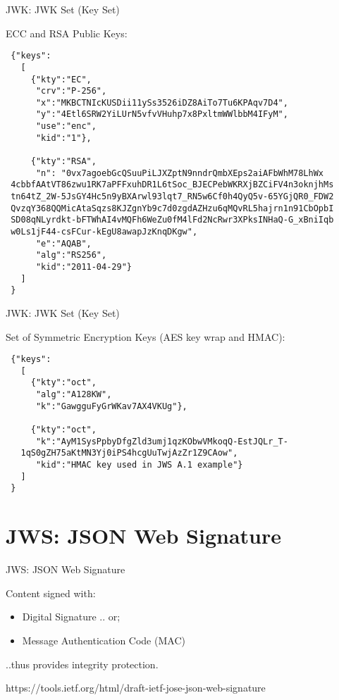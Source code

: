 \begin{frame}[fragile]{JWK: JWK Set (Key Set)}

ECC and RSA Public Keys:

\tiny

\begin{verbatim}
 {"keys":
   [
     {"kty":"EC",
      "crv":"P-256",
      "x":"MKBCTNIcKUSDii11ySs3526iDZ8AiTo7Tu6KPAqv7D4",
      "y":"4Etl6SRW2YiLUrN5vfvVHuhp7x8PxltmWWlbbM4IFyM",
      "use":"enc",
      "kid":"1"},

     {"kty":"RSA",
      "n": "0vx7agoebGcQSuuPiLJXZptN9nndrQmbXEps2aiAFbWhM78LhWx
 4cbbfAAtVT86zwu1RK7aPFFxuhDR1L6tSoc_BJECPebWKRXjBZCiFV4n3oknjhMs
 tn64tZ_2W-5JsGY4Hc5n9yBXArwl93lqt7_RN5w6Cf0h4QyQ5v-65YGjQR0_FDW2
 QvzqY368QQMicAtaSqzs8KJZgnYb9c7d0zgdAZHzu6qMQvRL5hajrn1n91CbOpbI
 SD08qNLyrdkt-bFTWhAI4vMQFh6WeZu0fM4lFd2NcRwr3XPksINHaQ-G_xBniIqb
 w0Ls1jF44-csFCur-kEgU8awapJzKnqDKgw",
      "e":"AQAB",
      "alg":"RS256",
      "kid":"2011-04-29"}
   ]
 }
\end{verbatim}

\end{frame}

\begin{frame}[fragile]{JWK: JWK Set (Key Set)}

Set of Symmetric Encryption Keys (AES key wrap and HMAC):

\small

\begin{verbatim}
 {"keys":
   [
     {"kty":"oct",
      "alg":"A128KW",
      "k":"GawgguFyGrWKav7AX4VKUg"},

     {"kty":"oct",
      "k":"AyM1SysPpbyDfgZld3umj1qzKObwVMkoqQ-EstJQLr_T-
   1qS0gZH75aKtMN3Yj0iPS4hcgUuTwjAzZr1Z9CAow",
      "kid":"HMAC key used in JWS A.1 example"}
   ]
 }
\end{verbatim}

\end{frame}

\section{JWS: JSON Web Signature}\label{jws-json-web-signature}

\begin{frame}{JWS: JSON Web Signature}

Content signed with:

\begin{itemize}
\itemsep1pt\parskip0pt
\item
  Digital Signature .. or;
\item
  Message Authentication Code (MAC)
\end{itemize}

..thus provides integrity protection.

https://tools.ietf.org/html/draft-ietf-jose-json-web-signature

\end{frame}

